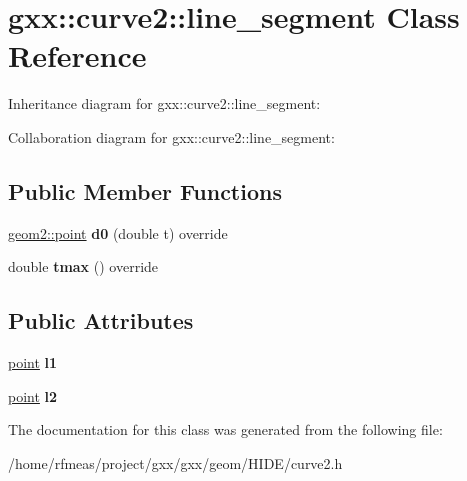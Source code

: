 \hypertarget{classgxx_1_1curve2_1_1line__segment}{}\section{gxx\+:\+:curve2\+:\+:line\+\_\+segment Class Reference}
\label{classgxx_1_1curve2_1_1line__segment}


Inheritance diagram for gxx\+:\+:curve2\+:\+:line\+\_\+segment\+:


Collaboration diagram for gxx\+:\+:curve2\+:\+:line\+\_\+segment\+:
\subsection*{Public Member Functions}
\begin{DoxyCompactItemize}
\item 
\hyperlink{classmalgo_1_1vector2}{geom2\+::point} {\bfseries d0} (double t) override\hypertarget{classgxx_1_1curve2_1_1line__segment_af7139d8045f65d76ebc09d1f637ad1cf}{}\label{classgxx_1_1curve2_1_1line__segment_af7139d8045f65d76ebc09d1f637ad1cf}

\item 
double {\bfseries tmax} () override\hypertarget{classgxx_1_1curve2_1_1line__segment_a45b221625a3363f53f7682017167ce89}{}\label{classgxx_1_1curve2_1_1line__segment_a45b221625a3363f53f7682017167ce89}

\end{DoxyCompactItemize}
\subsection*{Public Attributes}
\begin{DoxyCompactItemize}
\item 
\hyperlink{classmalgo_1_1vector2}{point} {\bfseries l1}\hypertarget{classgxx_1_1curve2_1_1line__segment_aa9cdd5652cdc9e75d1e2e221ef3eebfe}{}\label{classgxx_1_1curve2_1_1line__segment_aa9cdd5652cdc9e75d1e2e221ef3eebfe}

\item 
\hyperlink{classmalgo_1_1vector2}{point} {\bfseries l2}\hypertarget{classgxx_1_1curve2_1_1line__segment_a4183c0d764576bb58c4812f9db8726cb}{}\label{classgxx_1_1curve2_1_1line__segment_a4183c0d764576bb58c4812f9db8726cb}

\end{DoxyCompactItemize}


The documentation for this class was generated from the following file\+:\begin{DoxyCompactItemize}
\item 
/home/rfmeas/project/gxx/gxx/geom/\+H\+I\+D\+E/curve2.\+h\end{DoxyCompactItemize}
